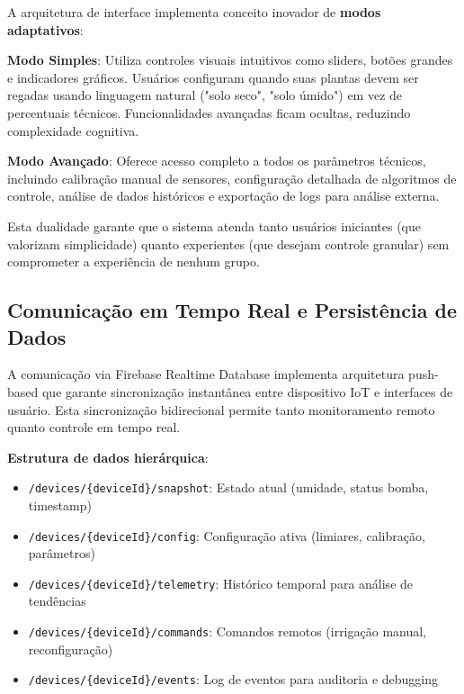 \documentclass[twoside,english,brazilian]{UNISINOSmonografia}
\begin{document}
A arquitetura de interface implementa conceito inovador de \textbf{modos adaptativos}:

\textbf{Modo Simples}: Utiliza controles visuais intuitivos como sliders, botões grandes e indicadores gráficos. Usuários configuram quando suas plantas devem ser regadas usando linguagem natural ("solo seco", "solo úmido") em vez de percentuais técnicos. Funcionalidades avançadas ficam ocultas, reduzindo complexidade cognitiva.

\textbf{Modo Avançado}: Oferece acesso completo a todos os parâmetros técnicos, incluindo calibração manual de sensores, configuração detalhada de algoritmos de controle, análise de dados históricos e exportação de logs para análise externa.

Esta dualidade garante que o sistema atenda tanto usuários iniciantes (que valorizam simplicidade) quanto experientes (que desejam controle granular) sem comprometer a experiência de nenhum grupo.


\subsection{Comunicação em Tempo Real e Persistência de Dados}

A comunicação via Firebase Realtime Database implementa arquitetura push-based que garante sincronização instantânea entre dispositivo IoT e interfaces de usuário. Esta sincronização bidirecional permite tanto monitoramento remoto quanto controle em tempo real.

\textbf{Estrutura de dados hierárquica}:
\begin{itemize}
\item \texttt{/devices/\{deviceId\}/snapshot}: Estado atual (umidade, status bomba, timestamp)
\item \texttt{/devices/\{deviceId\}/config}: Configuração ativa (limiares, calibração, parâmetros)
\item \texttt{/devices/\{deviceId\}/telemetry}: Histórico temporal para análise de tendências
\item \texttt{/devices/\{deviceId\}/commands}: Comandos remotos (irrigação manual, reconfiguração)
\item \texttt{/devices/\{deviceId\}/events}: Log de eventos para auditoria e debugging
\end{itemize}
\end{document}
